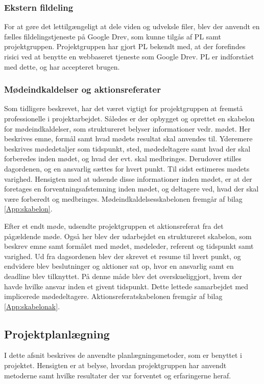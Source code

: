 	\subsubsection{Ekstern fildeling}
	For at gøre det lettilgængeligt at dele viden og udveksle filer, blev der anvendt en fælles fildelingstjeneste på Google Drev, som kunne tilgås af PL samt projektgruppen.  
	Projektgruppen har gjort PL bekendt med, at der forefindes risici ved at benytte en webbaseret tjeneste som Google Drev. PL er indforstået med dette, og har accepteret brugen.
	 
	\subsubsection{Mødeindkaldelser og aktionsreferater}
	Som tidligere beskrevet, har det været vigtigt for projektgruppen at fremstå professionelle i projektarbejdet. Således er der opbygget og oprettet en skabelon for mødeindkaldelser, som struktureret belyser informationer vedr. mødet. Her beskrives emne, formål samt hvad mødets resultat skal anvendes til. Yderemere beskrives mødedetaljer som tidspunkt, sted, mødedeltagere samt hvad der skal forberedes inden mødet, og hvad der evt. skal medbringes. Derudover stilles dagordenen, og en ansvarlig sættes for hvert punkt. Til sidst estimeres mødets varighed. Hensigten med at udsende disse informationer inden mødet, er at der foretages en forventningsafstemning inden mødet, og deltagere ved, hvad der skal være forberedt og medbringes. Mødeindkaldelsesskabelonen fremgår af bilag \ref{App:skabelon}.  
	
	Efter et endt møde, udsendte projektgruppen et aktionsreferat fra det pågældende møde. Også her blev der udarbejdet en struktureret skabelon, som beskrev emne samt formålet med mødet, mødeleder, referent og tidspunkt samt varighed. Ud fra dagsordenen blev der skrevet et resume til hvert punkt, og endvidere blev beslutninger og aktioner sat op, hvor en ansvarlig samt en deadline blev tilknyttet. På denne måde blev det overskueliggjort, hvem der havde hvilke ansvar inden et givent tidspunkt. Dette lettede samarbejdet med implicerede mødedeltagere. Aktionsreferatskabelonen fremgår af bilag \ref{App:skabelonak}.        
	
\subsection{Projektplanlægning}
	I dette afsnit beskrives de anvendte planlægningsmetoder, som er benyttet i projektet. Hensigten er at belyse, hvordan projektgruppen har anvendt metoderne samt hvilke resultater der var forventet og erfaringerne heraf.  


